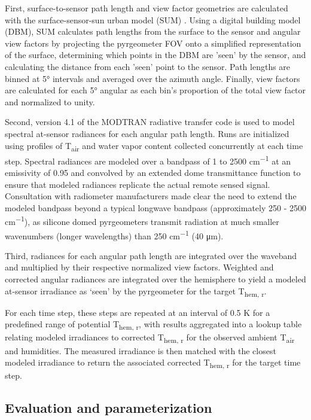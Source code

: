 \begin{bibunit}
First, surface-to-sensor path length and view factor geometries are calculated with the surface-sensor-sun urban model (SUM) \citep{Soux2004}. Using a digital building model (DBM), SUM calculates path lengths from the surface to the sensor and angular view factors by projecting the pyrgeometer FOV onto a simplified representation of the surface, determining which points in the DBM are 'seen' by the sensor, and calculating the distance from each 'seen' point to the sensor. Path lengths are binned at 5\si{\degree} intervals and averaged over the azimuth angle. Finally, view factors are calculated for each 5\si{\degree} angular as each bin's proportion of the total view factor and normalized to unity.

Second, version 4.1 of the MODTRAN radiative transfer code \citep{Berk1987} is used to model spectral at-sensor radiances for each angular path length. Runs are initialized using profiles of T\textsubscript{air} and water vapor content collected concurrently at each time step. Spectral radiances are modeled over a bandpass of 1 to 2500 \si{cm^{-1}} at an emissivity of 0.95 and convolved by an extended dome transmittance function to ensure that modeled radiances replicate the actual remote sensed signal. Consultation with radiometer manufacturers made clear the need to extend the modeled bandpass beyond a typical longwave bandpass (approximately 250 - 2500 \si{cm^{-1}}), as silicone domed pyrgeometers transmit radiation at much smaller wavenumbers (longer wavelengths) than 250 \si{cm^{-1}} (40 \si{\micro\meter}).

Third, radiances for each angular path length are integrated over the waveband and multiplied by their respective normalized view factors. Weighted and corrected angular radiances are integrated over the hemisphere to yield a modeled at-sensor irradiance as ‘seen’ by the pyrgeometer for the target T\textsubscript{hem, r}. 

For each time step, these steps are repeated at an interval of 0.5 \si{\kelvin} for a predefined range of potential T\textsubscript{hem, r}, with results aggregated into a lookup table relating modeled irradiances to corrected T\textsubscript{hem, r} for the observed ambient T\textsubscript{air} and humidities. The measured irradiance is then matched with the closest modeled irradiance to return the associated corrected T\textsubscript{hem, r} for the target time step. 

\subsection{Evaluation and parameterization}


\end{bibunit}
